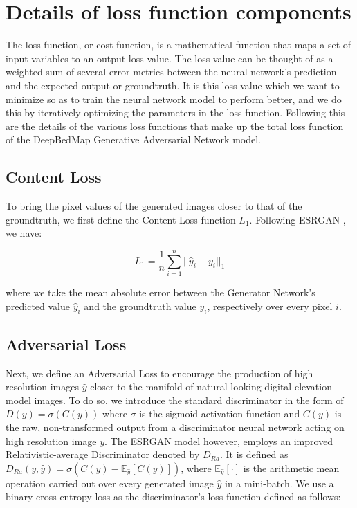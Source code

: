 \documentclass[tc, manuscript]{copernicus}
\begin{document}
\section{Details of loss function components} \label{appendix:A}

The loss function, or cost function, is a mathematical function that maps a set of input variables to an output loss value.
The loss value can be thought of as a weighted sum of several error metrics between the neural network's prediction and the expected output or groundtruth.
It is this loss value which we want to minimize so as to train the neural network model to perform better, and we do this by iteratively optimizing the parameters in the loss function.
Following this are the details of the various loss functions that make up the total loss function of the DeepBedMap Generative Adversarial Network model.

\subsection{Content Loss}

To bring the pixel values of the generated images closer to that of the groundtruth, we first define the Content Loss function $L_1$.
Following ESRGAN \citep{WangESRGANEnhancedSuperResolution2018}, we have:

\begin{equation}\label{eq:A1}
  L_1 = \dfrac{1}{n} \sum\limits_{i=1}^n ||\hat{y}_i - y_i||_{1}
\end{equation}

where we take the mean absolute error between the Generator Network's predicted value $\hat{y}_i$ and the groundtruth value $y_i$, respectively over every pixel $i$.

\subsection{Adversarial Loss}

Next, we define an Adversarial Loss to encourage the production of high resolution images $\hat{y}$ closer to the manifold of natural looking digital elevation model images.
To do so, we introduce the standard discriminator in the form of $D(y) = \sigma(C(y))$ where $\sigma$ is the sigmoid activation function and $C(y)$ is the raw, non-transformed output from a discriminator neural network acting on high resolution image $y$.
The ESRGAN model \citep{WangESRGANEnhancedSuperResolution2018} however, employs an improved Relativistic-average Discriminator \citep{Jolicoeur-Martineaurelativisticdiscriminatorkey2018} denoted by $D_{Ra}$.
It is defined as $D_{Ra}(y,\hat{y}) = \sigma(C(y) - \mathbb{E}_{\hat{y}}[C(\hat{y})])$, where $\mathbb{E}_{\hat{y}}[\cdot]$ is the arithmetic mean operation carried out over every generated image $\hat{y}$ in a mini-batch.
We use a binary cross entropy loss as the discriminator's loss function defined as follows:
\end{document}
